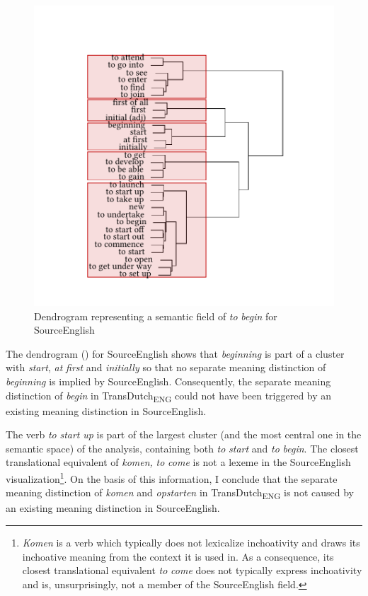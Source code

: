 \begin{figure}
\includegraphics[width=\textwidth]{figures/tree90.pdf}
\caption{\label{fig:4:87}  Dendrogram representing a semantic field of \textit{to} \textit{begin} for SourceEnglish}
\end{figure}

The dendrogram () for SourceEnglish shows that \textit{beginning} is part of a cluster with \textit{start}, \textit{at} \textit{first} and \textit{initially} so that no separate meaning distinction of \textit{beginning} is implied by SourceEnglish. Consequently, the separate meaning distinction of \textit{begin} in TransDutch\textsubscript{ENG} could not have been triggered by an existing meaning distinction in SourceEnglish.

The verb \textit{to} \textit{start} \textit{up} is part of the largest cluster (and the most central one in the semantic space) of the analysis, containing both \textit{to} \textit{start} and \textit{to} \textit{begin}. The closest translational equivalent of \textit{komen,} \textit{to} \textit{come} is not a lexeme in the SourceEnglish visualization\footnote{\textit{Komen} is a verb which typically does not lexicalize inchoativity and draws its inchoative meaning from the context it is used in. As a consequence, its closest translational equivalent \textit{to} \textit{come} does not typically express inchoativity and is, unsurprisingly, not a member of the SourceEnglish field.}. On the basis of this information, I conclude that the separate meaning distinction of \textit{komen} and \textit{opstarten} in TransDutch\textsubscript{ENG} is not caused by an existing meaning distinction in SourceEnglish.

